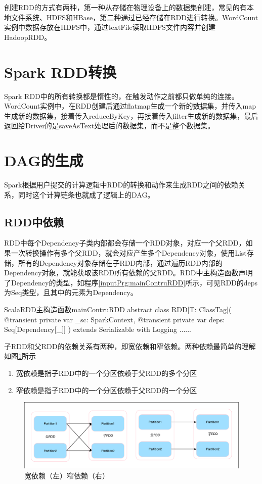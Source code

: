 创建RDD的方式有两种，第一种从存储在物理设备上的数据集创建，常见的有本地文件系统、HDFS和HBase，第二种通过已经存储在RDD进行转换。WordCount实例中数据存放在HDFS中，通过textFile读取HDFS文件内容并创建HadoopRDD。
\section{Spark RDD转换}

Spark RDD中的所有转换都是惰性的，在触发动作之前都只做单纯的连接。WordCount实例中，在RDD创建后通过flatmap生成一个新的数据集，并传入map生成新的数据集，接着传入reduceByKey，再接着传入filter生成新的数据集，最后返回给Driver的是saveAsText处理后的数据集，而不是整个数据集。
\section{DAG的生成}

Spark根据用户提交的计算逻辑中RDD的转换和动作来生成RDD之间的依赖关系，同时这个计算链条也就成了逻辑上的DAG。
\subsection{RDD中依赖}

RDD中每个Dependency子类内部都会存储一个RDD对象，对应一个父RDD，如果一次转换操作有多个父RDD，就会对应产生多个Dependency对象，使用List存储，所有的Dependency对象存储在子RDD内部，通过遍历RDD内部的Dependency对象，就能获取该RDD所有依赖的父RDD。RDD中主构造函数声明了Dependency的类型，如程序\ref{inputPrg:mainContruRDD}所示，可见RDD的deps为Seq类型，且其中的元素为Dependency。
\begin{codeInput}{Scala}{RDD主构造函数}{mainContruRDD}
abstract class RDD[T: ClassTag](
  @transient private var _sc: SparkContext,
  @transient private var deps: Seq[Dependency[_]]
  ) extends Serializable with Logging {
    ......
}
\end{codeInput}
子RDD和父RDD的依赖关系有两种，即宽依赖和窄依赖。两种依赖最简单的理解如图\ref{fig:deps}所示
\begin{enumerate}[\bfseries 1]
	\item 宽依赖是指子RDD中的一个分区依赖于父RDD的多个分区
	\item 窄依赖是指子RDD中的一个分区依赖于父RDD的一个分区
\end{enumerate}
\begin{figure}[H] 
	\centering
	\includegraphics[width=\textwidth]{figures/wideandnarroewdeps.pdf}
	\caption{宽依赖（左）窄依赖（右）}
	\label{fig:deps}
\end{figure}

